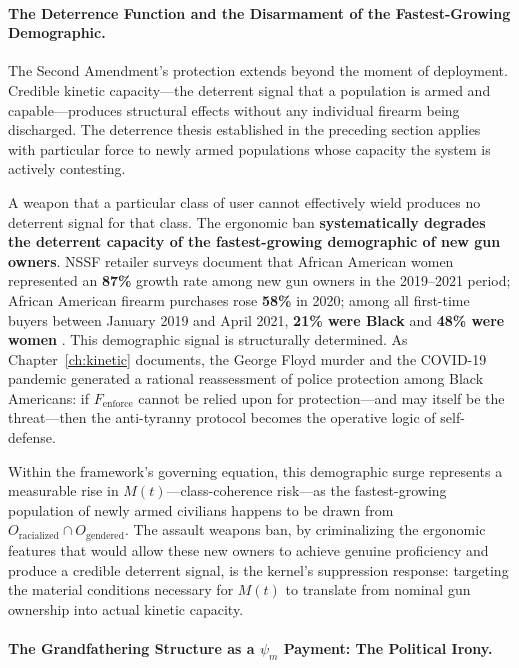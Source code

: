 \paragraph{The Deterrence Function and the Disarmament of the Fastest-Growing Demographic.}

The Second Amendment's protection extends beyond the moment of deployment. Credible kinetic capacity---the deterrent signal that a population is armed and capable---produces structural effects without any individual firearm being discharged. The deterrence thesis established in the preceding section applies with particular force to newly armed populations whose capacity the system is actively contesting.

A weapon that a particular class of user cannot effectively wield produces no deterrent signal for that class. The ergonomic ban \textbf{systematically degrades the deterrent capacity of the fastest-growing demographic of new gun owners}. NSSF retailer surveys document that African American women represented an \textbf{87\%} growth rate among new gun owners in the 2019--2021 period; African American firearm purchases rose \textbf{58\%} in 2020; among all first-time buyers between January 2019 and April 2021, \textbf{21\% were Black} and \textbf{48\% were women} \cite{nssf_black_gun_owners_2021, nih_covid_guns_2022}. This demographic signal is structurally determined. As Chapter~\ref{ch:kinetic} documents, the George Floyd murder and the COVID-19 pandemic generated a rational reassessment of police protection among Black Americans: if $F_{\text{enforce}}$ cannot be relied upon for protection---and may itself be the threat---then the anti-tyranny protocol becomes the operative logic of self-defense.

Within the framework's governing equation, this demographic surge represents a measurable rise in $M(t)$---class-coherence risk---as the fastest-growing population of newly armed civilians happens to be drawn from $O_{\text{racialized}} \cap O_{\text{gendered}}$. The assault weapons ban, by criminalizing the ergonomic features that would allow these new owners to achieve genuine proficiency and produce a credible deterrent signal, is the kernel's suppression response: targeting the material conditions necessary for $M(t)$ to translate from nominal gun ownership into actual kinetic capacity.

\paragraph{The Grandfathering Structure as a $\psi_m$ Payment: The Political Irony.}

